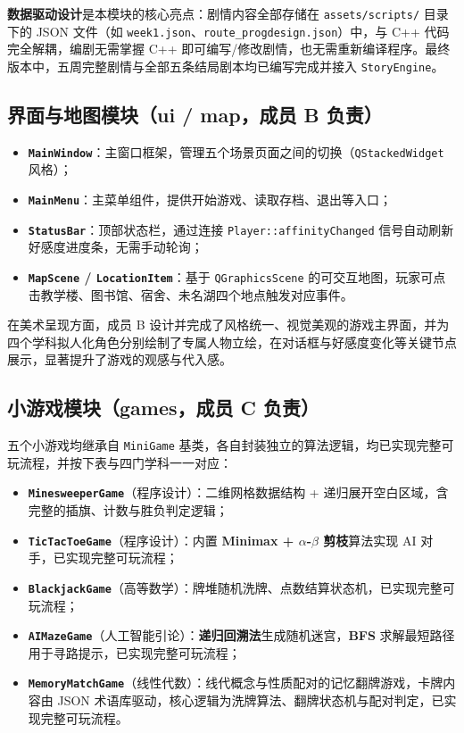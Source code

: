 \documentclass[12pt]{article}
\newcommand{\module}[1]{\texttt{#1}}
\begin{document}
\textbf{数据驱动设计}是本模块的核心亮点：剧情内容全部存储在 \module{assets/scripts/} 目录下的 JSON 文件（如 \texttt{week1.json}、\texttt{route\_progdesign.json}）中，与 C++ 代码完全解耦，编剧无需掌握 C++ 即可编写/修改剧情，也无需重新编译程序。最终版本中，五周完整剧情与全部五条结局剧本均已编写完成并接入 \module{StoryEngine}。

\subsection{界面与地图模块（ui / map，成员 B 负责）}
\begin{itemize}[itemsep=3pt]
  \item \textbf{\module{MainWindow}}：主窗口框架，管理五个场景页面之间的切换（\texttt{QStackedWidget} 风格）；
  \item \textbf{\module{MainMenu}}：主菜单组件，提供开始游戏、读取存档、退出等入口；
  \item \textbf{\module{StatusBar}}：顶部状态栏，通过连接 \texttt{Player::affinityChanged} 信号自动刷新好感度进度条，无需手动轮询；
  \item \textbf{\module{MapScene} / \module{LocationItem}}：基于 \texttt{QGraphicsScene} 的可交互地图，玩家可点击教学楼、图书馆、宿舍、未名湖四个地点触发对应事件。
\end{itemize}

在美术呈现方面，成员 B 设计并完成了风格统一、视觉美观的游戏主界面，并为四个学科拟人化角色分别绘制了专属人物立绘，在对话框与好感度变化等关键节点展示，显著提升了游戏的观感与代入感。

\subsection{小游戏模块（games，成员 C 负责）}
五个小游戏均继承自 \module{MiniGame} 基类，各自封装独立的算法逻辑，均已实现完整可玩流程，并按下表与四门学科一一对应：

\begin{itemize}[itemsep=3pt]
  \item \textbf{\module{MinesweeperGame}}（程序设计）：二维网格数据结构 + 递归展开空白区域，含完整的插旗、计数与胜负判定逻辑；
  \item \textbf{\module{TicTacToeGame}}（程序设计）：内置 \textbf{Minimax + $\alpha$-$\beta$ 剪枝}算法实现 AI 对手，已实现完整可玩流程；
  \item \textbf{\module{BlackjackGame}}（高等数学）：牌堆随机洗牌、点数结算状态机，已实现完整可玩流程；
  \item \textbf{\module{AIMazeGame}}（人工智能引论）：\textbf{递归回溯法}生成随机迷宫，\textbf{BFS} 求解最短路径用于寻路提示，已实现完整可玩流程；
  \item \textbf{\module{MemoryMatchGame}}（线性代数）：线代概念与性质配对的记忆翻牌游戏，卡牌内容由 JSON 术语库驱动，核心逻辑为洗牌算法、翻牌状态机与配对判定，已实现完整可玩流程。
\end{itemize}
\end{document}
